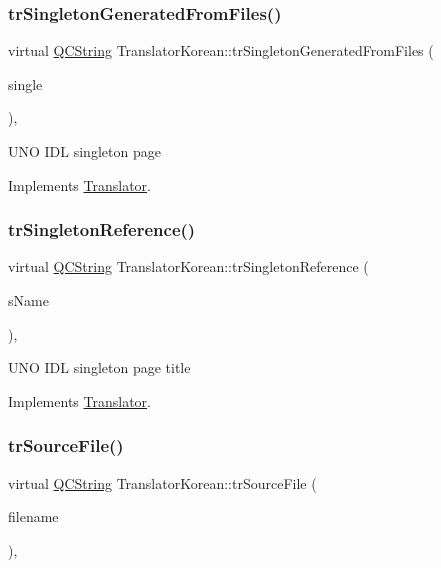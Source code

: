 \subsubsection{\texorpdfstring{trSingletonGeneratedFromFiles()}{trSingletonGeneratedFromFiles()}}
{\footnotesize\ttfamily virtual \mbox{\hyperlink{class_q_c_string}{Q\+C\+String}} Translator\+Korean\+::tr\+Singleton\+Generated\+From\+Files (\begin{DoxyParamCaption}\item[{bool}]{single }\end{DoxyParamCaption})\hspace{0.3cm}{\ttfamily [inline]}, {\ttfamily [virtual]}}

U\+NO I\+DL singleton page 

Implements \mbox{\hyperlink{class_translator}{Translator}}.

\mbox{\label{class_translator_korean_abf1bc242de55e5e8b262230baa3290cd}} 
\subsubsection{\texorpdfstring{trSingletonReference()}{trSingletonReference()}}
{\footnotesize\ttfamily virtual \mbox{\hyperlink{class_q_c_string}{Q\+C\+String}} Translator\+Korean\+::tr\+Singleton\+Reference (\begin{DoxyParamCaption}\item[{const char $\ast$}]{s\+Name }\end{DoxyParamCaption})\hspace{0.3cm}{\ttfamily [inline]}, {\ttfamily [virtual]}}

U\+NO I\+DL singleton page title 

Implements \mbox{\hyperlink{class_translator}{Translator}}.

\mbox{\label{class_translator_korean_ad43b7a8eaf87e6687c829e6bc4b5b81c}} 
\subsubsection{\texorpdfstring{trSourceFile()}{trSourceFile()}}
{\footnotesize\ttfamily virtual \mbox{\hyperlink{class_q_c_string}{Q\+C\+String}} Translator\+Korean\+::tr\+Source\+File (\begin{DoxyParamCaption}\item[{\mbox{\hyperlink{class_q_c_string}{Q\+C\+String}} \&}]{filename }\end{DoxyParamCaption})\hspace{0.3cm}{\ttfamily [inline]}, {\ttfamily [virtual]}}

